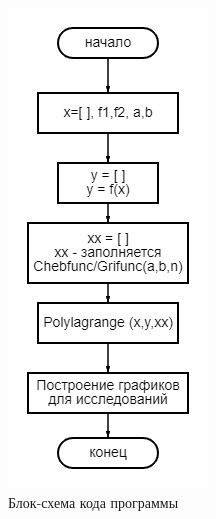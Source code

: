 \documentclass[a4paper]{article}
\begin{document}
\begin{figure}[h!]
\begin{center}
 \includegraphics[scale=0.7]{diagram (5).png} 
 \end{center}
\caption{Блок-схема кода программы} \label{Рис1}
\end{figure}
\end{document}
